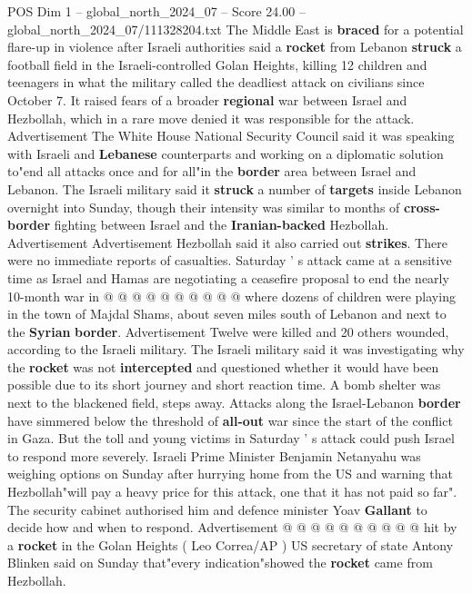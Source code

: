 \begin{textsample}{POS Dim 1 – global\_north\_2024\_07 – Score 24.00 – global\_north\_2024\_07/111328204.txt}  \label{ex:f1_pos_186}
The Middle East is \textbf{braced} for a potential flare-up in violence after Israeli authorities said a \textbf{rocket} from Lebanon \textbf{struck} a football field in the Israeli-controlled Golan Heights, killing 12 children and teenagers in what the military called the deadliest attack on civilians since October 7.
It raised fears of a broader \textbf{regional} war between Israel and Hezbollah, which in a rare move denied it was responsible for the attack.
Advertisement The White House National Security Council said it was speaking with Israeli and \textbf{Lebanese} counterparts and working on a diplomatic solution to"end all attacks once and for all"in the \textbf{border} area between Israel and Lebanon.
The Israeli military said it \textbf{struck} a number of \textbf{targets} inside Lebanon overnight into Sunday, though their intensity was similar to months of \textbf{cross-border} fighting between Israel and the \textbf{Iranian-backed} Hezbollah.
Advertisement Advertisement Hezbollah said it also carried out \textbf{strikes}.
There were no immediate reports of casualties.
Saturday ' s attack came at a sensitive time as Israel and Hamas are negotiating a ceasefire proposal to end the nearly 10-month war in @ @ @ @ @ @ @ @ @ @ where dozens of children were playing in the town of Majdal Shams, about seven miles south of Lebanon and next to the \textbf{Syrian} \textbf{border}.
Advertisement Twelve were killed and 20 others wounded, according to the Israeli military.
The Israeli military said it was investigating why the \textbf{rocket} was not \textbf{intercepted} and questioned whether it would have been possible due to its short journey and short reaction time.
A bomb shelter was next to the blackened field, steps away.
Attacks along the Israel-Lebanon \textbf{border} have simmered below the threshold of \textbf{all-out} war since the start of the conflict in Gaza.
But the toll and young victims in Saturday ' s attack could push Israel to respond more severely.
Israeli Prime Minister Benjamin Netanyahu was weighing options on Sunday after hurrying home from the US and warning that Hezbollah"will pay a heavy price for this attack, one that it has not paid so far".
The security cabinet authorised him and defence minister Yoav \textbf{Gallant} to decide how and when to respond.
Advertisement @ @ @ @ @ @ @ @ @ @ hit by a \textbf{rocket} in the Golan Heights ( Leo Correa/AP ) US secretary of state Antony Blinken said on Sunday that"every indication"showed the \textbf{rocket} came from Hezbollah.

\end{textsample}
